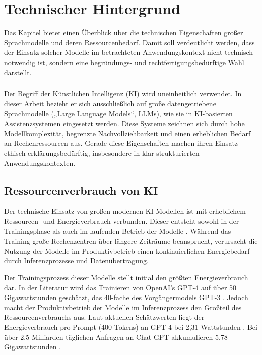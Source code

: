 \chapter{Technischer Hintergrund}
\label{chap:technischerhintergrund}

Das Kapitel bietet einen Überblick über die technischen Eigenschaften großer Sprachmodelle und deren Ressourcenbedarf. Damit soll verdeutlicht werden, dass der Einsatz solcher Modelle im betrachteten Anwendungskontext nicht technisch notwendig ist, sondern eine begründungs- und rechtfertigungsbedürftige Wahl darstellt.

\paragraph{}

Der Begriff der Künstlichen Intelligenz (KI) wird uneinheitlich verwendet. In dieser Arbeit bezieht er sich ausschließlich auf große datengetriebene Sprachmodelle („Large Language Models“, LLMs), wie sie in KI-basierten Assistenzsystemen eingesetzt werden. Diese Systeme zeichnen sich durch hohe Modellkomplexität, begrenzte Nachvollziehbarkeit und einen erheblichen Bedarf an Rechenressourcen aus. Gerade diese Eigenschaften machen ihren Einsatz ethisch erklärungsbedürftig, insbesondere in klar strukturierten Anwendungskontexten.

\section{Ressourcenverbrauch von KI}
Der technische Einsatz von großen modernen KI Modellen ist mit erheblichem Ressourcen- und Energieverbrauch verbunden. Dieser entsteht sowohl in der Trainingsphase als auch im laufenden Betrieb der Modelle \cite{jiSystematicReviewElectricity2026a}. Während das Training große Rechenzentren über längere Zeiträume beansprucht, verursacht die Nutzung der Modelle im Produktivbetrieb einen kontinuierlichen Energiebedarf durch Inferenzprozesse und Datenübertragung.

Der Trainingsprozess dieser Modelle stellt initial den größten Energieverbrauch dar. In der Literatur wird das Trainieren von OpenAI's GPT-4 auf über 50 Gigawattstunden geschätzt, das 40-fache des Vorgängermodels GPT-3 \cite{jiSystematicReviewElectricity2026a}. Jedoch macht der Produktivbetrieb der Modelle im Inferenzprozess den Großteil des Ressourcenverbrauchs aus. Laut aktuellen Schätzwerten liegt der Energieverbrauch pro Prompt (400 Tokens) an GPT-4 bei 2,31 Wattstunden \cite{elsworthMeasuringEnvironmentalImpact2025,jeghamHowHungryAI2025}. Bei über 2,5 Milliarden täglichen Anfragen an Chat-GPT akkumulieren 5,78 Gigawattstunden \cite{chatterjiHowPeopleUsea}.

